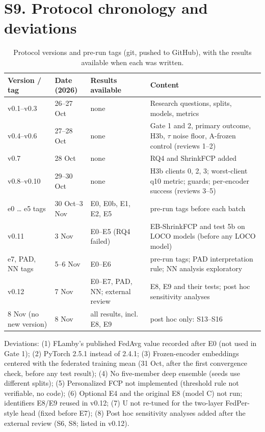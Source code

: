 \documentclass[10pt]{article}
\begin{document}
\section*{S9. Protocol chronology and deviations}
\begin{table}[!htbp]
\centering
\scriptsize
\caption{Protocol versions and pre-run tags (git, pushed to GitHub), with the results available when each was written.}
\label{tab:s9}
\begin{tabular}{@{}llp{3.6cm}p{6.2cm}@{}}
\toprule
Version / tag & Date (2026) & Results available & Content \\
\midrule
v0.1--v0.3 & 26--27 Oct & none & Research questions, splits, models, metrics \\
v0.4--v0.6 & 27--28 Oct & none & Gate 1 and 2, primary outcome, H3b, $\tau$ noise floor, A-frozen control (reviews 1--2) \\
v0.7 & 28 Oct & none & RQ4 and ShrinkFCP added \\
v0.8--v0.10 & 29--30 Oct & none & H3b clients 0, 2, 3; worst-client q10 metric; guards; per-encoder success (reviews 3--5) \\
e0 \ldots{} e5 tags & 30 Oct--3 Nov & E0, E0b, E1, E2, E5 & pre-run tags before each batch \\
v0.11 & 3 Nov & E0--E5 (RQ4 failed) & EB-ShrinkFCP and test 5b on LOCO models (before any LOCO model) \\
e7, PAD, NN tags & 5--6 Nov & E0--E6 & pre-run tags; PAD interpretation rule; NN analysis exploratory \\
v0.12 & 7 Nov & E0--E7, PAD, NN; external review & E8, E9 and their tests; post hoc sensitivity analyses \\
8 Nov (no new version) & 8 Nov & all results, incl. E8, E9 & post hoc only: S13--S16 \\
\bottomrule
\end{tabular}
\end{table}
Deviations: (1) FLamby's published FedAvg value recorded after E0 (not used in Gate 1); (2) PyTorch 2.5.1 instead of 2.4.1; (3) Frozen-encoder embeddings centered with the federated training mean (31 Oct, after the first convergence check, before any test result); (4) No five-member deep ensemble (seeds use different splits); (5) Personalized FCP not implemented (threshold rule not verifiable, no code); (6) Optional E4 and the original E8 (model C) not run; identifiers E8/E9 reused in v0.12; (7) U not re-tuned for the two-layer FedPer-style head (fixed before E7); (8) Post hoc sensitivity analyses added after the external review (S6, S8; listed in v0.12).
\end{document}
